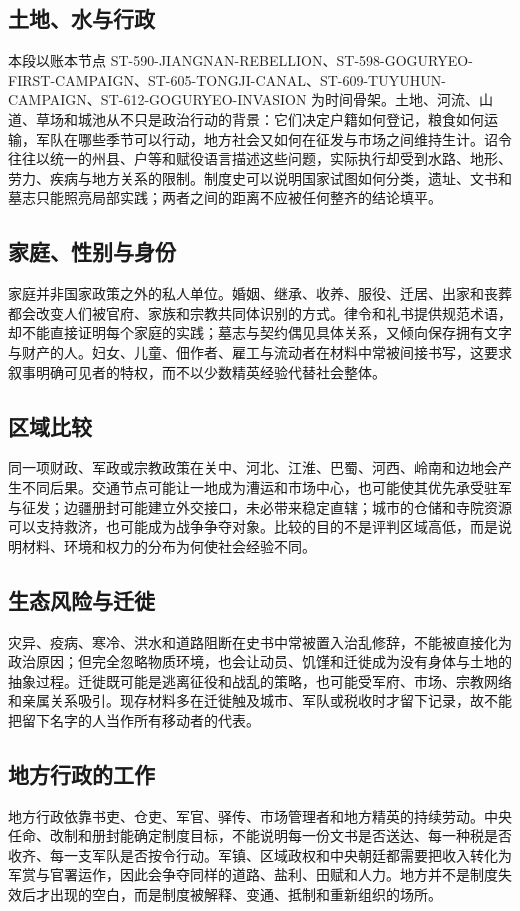 \subsection{土地、水与行政}
本段以账本节点 ST-590-JIANGNAN-REBELLION、ST-598-GOGURYEO-FIRST-CAMPAIGN、ST-605-TONGJI-CANAL、ST-609-TUYUHUN-CAMPAIGN、ST-612-GOGURYEO-INVASION 为时间骨架。土地、河流、山道、草场和城池从不只是政治行动的背景：它们决定户籍如何登记，粮食如何运输，军队在哪些季节可以行动，地方社会又如何在征发与市场之间维持生计。诏令往往以统一的州县、户等和赋役语言描述这些问题，实际执行却受到水路、地形、劳力、疾病与地方关系的限制。制度史可以说明国家试图如何分类，遗址、文书和墓志只能照亮局部实践；两者之间的距离不应被任何整齐的结论填平。

\subsection{家庭、性别与身份}
家庭并非国家政策之外的私人单位。婚姻、继承、收养、服役、迁居、出家和丧葬都会改变人们被官府、家族和宗教共同体识别的方式。律令和礼书提供规范术语，却不能直接证明每个家庭的实践；墓志与契约偶见具体关系，又倾向保存拥有文字与财产的人。妇女、儿童、佃作者、雇工与流动者在材料中常被间接书写，这要求叙事明确可见者的特权，而不以少数精英经验代替社会整体。

\subsection{区域比较}
同一项财政、军政或宗教政策在关中、河北、江淮、巴蜀、河西、岭南和边地会产生不同后果。交通节点可能让一地成为漕运和市场中心，也可能使其优先承受驻军与征发；边疆册封可能建立外交接口，未必带来稳定直辖；城市的仓储和寺院资源可以支持救济，也可能成为战争争夺对象。比较的目的不是评判区域高低，而是说明材料、环境和权力的分布为何使社会经验不同。

\subsection{生态风险与迁徙}
灾异、疫病、寒冷、洪水和道路阻断在史书中常被置入治乱修辞，不能被直接化为政治原因；但完全忽略物质环境，也会让动员、饥馑和迁徙成为没有身体与土地的抽象过程。迁徙既可能是逃离征役和战乱的策略，也可能受军府、市场、宗教网络和亲属关系吸引。现存材料多在迁徙触及城市、军队或税收时才留下记录，故不能把留下名字的人当作所有移动者的代表。

\subsection{地方行政的工作}
地方行政依靠书吏、仓吏、军官、驿传、市场管理者和地方精英的持续劳动。中央任命、改制和册封能确定制度目标，不能说明每一份文书是否送达、每一种税是否收齐、每一支军队是否按令行动。军镇、区域政权和中央朝廷都需要把收入转化为军赏与官署运作，因此会争夺同样的道路、盐利、田赋和人力。地方并不是制度失效后才出现的空白，而是制度被解释、变通、抵制和重新组织的场所。

